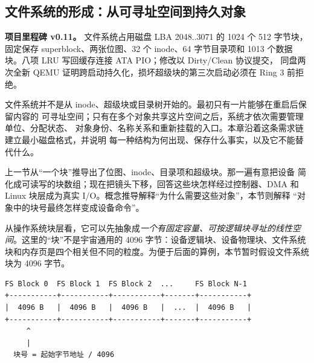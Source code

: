 \begin{filesystemlayout}

\chapter{文件系统的形成：从可寻址空间到持久对象}

\begin{statebox}
\textbf{项目里程碑 v0.11。} 文件系统占用磁盘 LBA 2048..3071 的 1024 个
512 字节块，固定保存 superblock、两张位图、32 个 inode、64 字节目录项和
1013 个数据块。八项 LRU 写回缓存连接 ATA PIO；修改以 Dirty/Clean 协议提交，
同盘两次全新 QEMU 证明跨启动持久化，损坏超级块的第三次启动必须在 Ring 3 前拒绝。
\end{statebox}

\begin{keyidea}
文件系统并不是从 inode、超级块或目录树开始的。最初只有一片能够在重启后保留内容的
可寻址空间；只有在多个对象共享这片空间之后，系统才依次需要管理单位、分配状态、
对象身份、名称关系和重新挂载的入口。本章沿着这条需求链建立最小磁盘格式，并说明
每一种结构为何出现、保存什么事实，以及它不能替代什么。
\end{keyidea}





\iffalse



上一节从“一个块”推导出了位图、inode、目录项和超级块。那一遍有意把设备
简化成可读写的块数组；现在把镜头下移，回答这些块怎样经过控制器、DMA 和
Linux 块层成为真实 I/O。概念推导解释“为什么需要这些对象”，本节则解释
“对象中的块号最终怎样变成设备命令”。

从操作系统块层看，它可以先抽象成\emph{一个有固定容量、可按逻辑块寻址的线性空间}。这里的“块”不是宇宙通用的 4096 字节：设备逻辑块、设备物理块、文件系统块和内存页是四个相关但不同的粒度。为便于后面的算例，本节暂时假设文件系统块为 4096 字节。

\begin{lstlisting}
FS Block 0  FS Block 1  FS Block 2  ...     FS Block N-1
+-----------+-----------+-----------+-------+-----------+
|  4096 B   |  4096 B   |  4096 B   |  ...  |  4096 B   |
+-----------+-----------+-----------+-------+-----------+
     ^
     |
  块号 = 起始字节地址 / 4096
\end{lstlisting}


\end{filesystemlayout}
